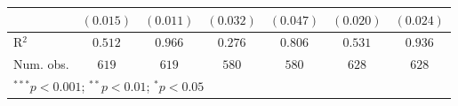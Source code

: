 \begin{table}
\begin{center}
\begin{tabular}{l c c c c c c}
                    & $(0.015)$      & $(0.011)$      & $(0.032)$      & $(0.047)$    & $(0.020)$      & $(0.024)$     \\
\hline
R$^2$               & $0.512$        & $0.966$        & $0.276$        & $0.806$      & $0.531$        & $0.936$       \\
Num. obs.           & $619$          & $619$          & $580$          & $580$        & $628$          & $628$         \\
\hline
\multicolumn{7}{l}{\scriptsize{$^{***}p<0.001$; $^{**}p<0.01$; $^{*}p<0.05$}}
\end{tabular}
\label{table:coefficients}
\end{center}
\end{table}
